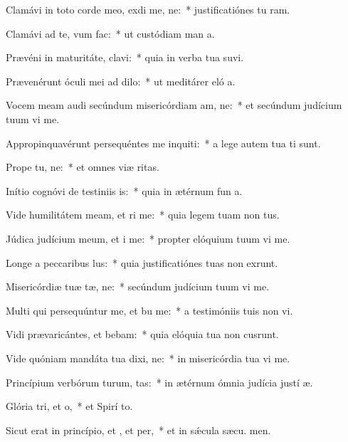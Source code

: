 \item Clamávi in toto corde meo, exdi me, ne:~* justificatiónes tu ram.
\item Clamávi ad te, vum  fac:~* ut custódiam man a.
\item Prævéni in maturitáte,  clavi:~* quia in verba tua suvi.
\item Prævenérunt óculi mei ad  dilo:~* ut meditárer eló a.
\item Vocem meam audi secúndum misericórdiam am, ne:~* et secúndum judícium tuum vi me.
\item Appropinquavérunt persequéntes me inquiti:~* a lege autem tua  ti sunt.
\item Prope  tu, ne:~* et omnes viæ  ritas.
\item Inítio cognóvi de testiniis is:~* quia in ætérnum fun a.
\item Vide humilitátem meam, et ri me:~* quia legem tuam non  tus.
\item Júdica judícium meum, et i me:~* propter elóquium tuum vi me.
\item Longe a peccaribus lus:~* quia justificatiónes tuas non exrunt.
\item Misericórdiæ tuæ tæ, ne:~* secúndum judícium tuum vi me.
\item Multi qui persequúntur me, et bu me:~* a testimóniis tuis non vi.
\item Vidi prævaricántes, et bebam:~* quia elóquia tua non cusrunt.
\item Vide quóniam mandáta tua dixi, ne:~* in misericórdia tua vi me.
\item Princípium verbórum turum, tas:~* in ætérnum ómnia judícia justí æ.
\item Glória tri, et o,~* et Spirí to.
\item Sicut erat in princípio, et , et per,~* et in sǽcula sæcu. men.
